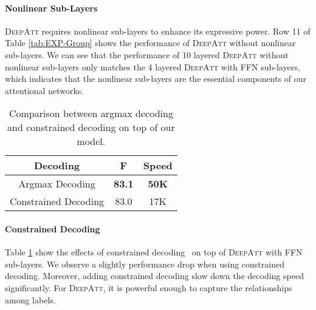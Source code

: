 \documentclass[letterpaper]{article} \usepackage{aaai18}  \usepackage{times}  \usepackage{helvet}  \usepackage{courier}  \usepackage{url}  \usepackage{graphicx}  \frenchspacing  \setlength{\pdfpagewidth}{8.5in}  \setlength{\pdfpageheight}{11in}  \usepackage{latexsym}
\begin{document}
\paragraph{Nonlinear Sub-Layers} \textsc{DeepAtt} requires nonlinear sub-layers to enhance its expressive power. Row 11 of Table \ref{tab:EXP-Group} shows the performance of \textsc{DeepAtt} without nonlinear sub-layers. We can see that the performance of 10 layered \textsc{DeepAtt} without nonlinear sub-layers only matches the 4 layered \textsc{DeepAtt} with FFN sub-layers, which indicates that the nonlinear sub-layers are the essential components of our attentional networks.

\begin{table}[!t]
\centering
\begin{tabular}{c|cc}
Decoding & F & Speed \\\hline
Argmax Decoding & \textbf{83.1} & \textbf{50K} \\
Constrained Decoding & 83.0 & 17K
\end{tabular}
\caption{Comparison between argmax decoding and constrained decoding on top of our model.}
\label{EXP:Decoding}
\end{table}

\paragraph{Constrained Decoding} Table \ref{EXP:Decoding} show the effects of constrained decoding~\cite{he2017deep} on top of \textsc{DeepAtt} with FFN sub-layers. We observe a slightly performance drop when using constrained decoding. Moreover, adding constrained decoding slow down the decoding speed significantly. For \textsc{DeepAtt}, it is powerful enough to capture the relationships among labels.
\end{document}
